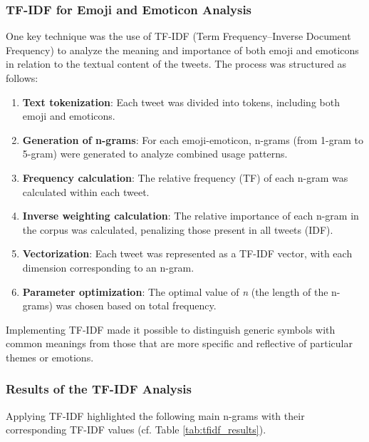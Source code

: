 \subsubsection{TF-IDF for Emoji and Emoticon Analysis}
One key technique was the use of TF-IDF (Term Frequency–Inverse Document Frequency) to analyze the meaning and importance of both emoji and emoticons in relation to the textual content of the tweets. The process was structured as follows:
\begin{enumerate}
    \item \textbf{Text tokenization}: Each tweet was divided into tokens, including both emoji and emoticons.
    \item \textbf{Generation of n-grams}: For each emoji-emoticon, n-grams (from 1-gram to 5-gram) were generated to analyze combined usage patterns.
    \item \textbf{Frequency calculation}: The relative frequency (TF) of each n-gram was calculated within each tweet.
    \item \textbf{Inverse weighting calculation}: The relative importance of each n-gram in the corpus was calculated, penalizing those present in all tweets (IDF).
    \item \textbf{Vectorization}: Each tweet was represented as a TF-IDF vector, with each dimension corresponding to an n-gram.
    \item \textbf{Parameter optimization}: The optimal value of \textit{n} (the length of the n-grams) was chosen based on total frequency.
\end{enumerate}
Implementing TF-IDF made it possible to distinguish generic symbols with common meanings from those that are more specific and reflective of particular themes or emotions.

\subsubsection{Results of the TF-IDF Analysis}
Applying TF-IDF highlighted the following main n-grams with their corresponding TF-IDF values (cf. Table \ref{tab:tfidf_results}).

